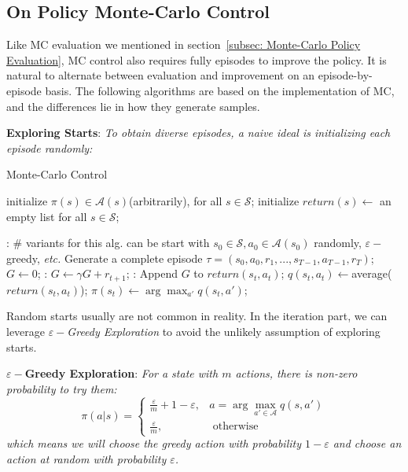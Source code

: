 \documentclass{progartcn}
\begin{document}
	\subsection{On Policy Monte-Carlo Control}

			Like MC evaluation we mentioned in section~\ref{subsec: Monte-Carlo Policy Evaluation}, MC control also requires fully episodes to improve the policy. It is natural to alternate between evaluation and improvement on an episode-by-episode basis. The following algorithms are based on the implementation of MC, and the differences lie in how they generate samples.

			\textbf{Exploring Starts}: \textit{To obtain diverse episodes, a naive ideal is initializing each episode randomly:}
			
			\begin{algorithm}[h]
			\caption{Monte-Carlo Control}
			\label{alg: Monte-Carlo Control}
			\begin{algorithmic}[1]
			\State initialize $\pi(s)\in \mathcal{A}(s)$(arbitrarily), for all $s\in \mathcal{S}$; initialize $return(s)\gets$ an empty list for all $s\in\mathcal{S}$;
	        
            :
            	\Statex \# variants for this alg. can be start with $s_0\in\mathcal{S},a_0\in\mathcal{A}(s_0)$ randomly, $\varepsilon-$greedy, \textit{etc.}
            	\State Generate a complete episode $\tau=(s_0, a_0, r_1,...,s_{T-1},a_{T-1},r_{T})$;
            	\State $G\gets0$;
            	:
            		\State $G\gets\gamma G+r_{t+1}$;
            		:
            			\State Append $G$ to $return(s_t, a_t)$;
            			\State $q(s_t,a_t)\gets$average($return(s_t,a_t)$);
            			\State $\pi(s_t)\gets\arg\max_{a'}q(s_t,a')$;
            		\EndIf
            	\EndFor
            \EndFor
	        \end{algorithmic}
	        \end{algorithm}

			Random starts usually are not common in reality. In the iteration part, we can leverage \textit{$\varepsilon-$Greedy Exploration} to avoid the unlikely assumption of exploring starts.

			\textbf{$\varepsilon-$Greedy Exploration}: \textit{For a state with $m$ actions, there is non-zero probability to try them:}
			\[\pi(a|s)=\begin{cases}\frac{\varepsilon}{m}+1-\varepsilon, & a=\arg\max_{a'\in\mathcal{A}}q(s,a')\\\frac{\varepsilon}{m}, & \text{ otherwise}\end{cases}\]
			\textit{which means we will choose the greedy action with probability $1-\varepsilon$ and choose an action at random with probability $\varepsilon$.}
\end{document}

